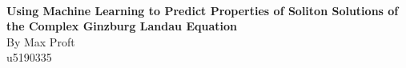 \documentclass[a4paper,12pt]{report}
\begin{document}
\begin{titlepage}
\centering
{\ \\ }
\vspace{3cm}
{\bf  \fontsize{1.35cm}{2.5cm}\selectfont \vspace{0.5cm} Using Machine\vspace{0.5cm} Learning to \vspace{0.5cm}Predict Properties\vspace{0.5cm} of Soliton Solutions of\vspace{0.5cm} the Complex \vspace{0.5cm}Ginzburg Landau Equation\vspace{0.5cm}}\\
{\Huge By Max Proft}\\
{\Huge u5190335}
\end{titlepage}










\newcommand{\unnum}[2]{
\ifthenelse{\equal{#1}{chapter}}{\chapter*{#2}}{
\ifthenelse{\equal{#1}{section}}{\section*{#2}}{
\ifthenelse{\equal{#1}{subsection}}{\subsection*{#2}}
{\chapter*{ERROR: #2}}}}
\addcontentsline{toc}{#1}{#2} 
}%
\tableofcontents{}

\onehalfspacing
\end{document}
